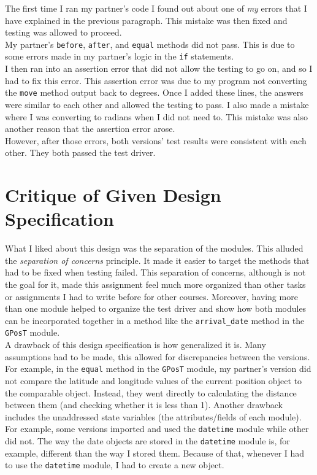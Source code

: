\documentclass[12pt]{article}
\begin{document}
        The first time I ran my partner's code I found out about one of \textit{my} errors that I have explained in the previous paragraph. This mistake was then fixed and testing was allowed to proceed.\\

        My partner's \verb|before|, \verb|after|, and \verb|equal| methods did not pass. This is due to some errors made in my partner's logic in the \verb|if| statements.\\        

        I then ran into an assertion error that did not allow the testing to go on, and so I had to fix this error. This assertion error was due to my program not converting the \verb|move| method output back to degrees. Once I added these lines, the answers were similar to each other and allowed the testing to pass. I also made a mistake where I was converting to radians when I did not need to. This mistake was also another reason that the assertion error arose.\\

        However, after those errors, both versions' test results were consistent with each other. They both passed the test driver.\\

\section{Critique of Given Design Specification}

        What I liked about this design was the separation of the modules. This alluded the \textit{separation of concerns} principle. It made it easier to target the methods that had to be fixed when testing failed. This separation of concerns, although is not the goal for it, made this assignment feel much more organized than other tasks or assignments I had to write before for other courses. Moreover, having more than one module helped to organize the test driver and show how both modules can be incorporated together in a method like the \verb|arrival_date| method in the \verb|GPosT| module.\\

        A drawback of this design specification is how generalized it is. Many assumptions had to be made, this allowed for discrepancies between the versions. For example, in the \verb|equal| method in the \verb|GPosT| module, my partner's version did not compare the latitude and longitude values of the current position object to the comparable object. Instead, they went directly to calculating the distance between them (and checking whether it is less than 1). Another drawback includes the unaddressed state variables (the attributes/fields of each module). For example, some versions imported and used the \verb|datetime| module while other did not. The way the date objects are stored in the \verb|datetime| module is, for example, different than the way I stored them. Because of that, whenever I had to use the \verb|datetime| module, I had to create a new object. 
\end{document}
